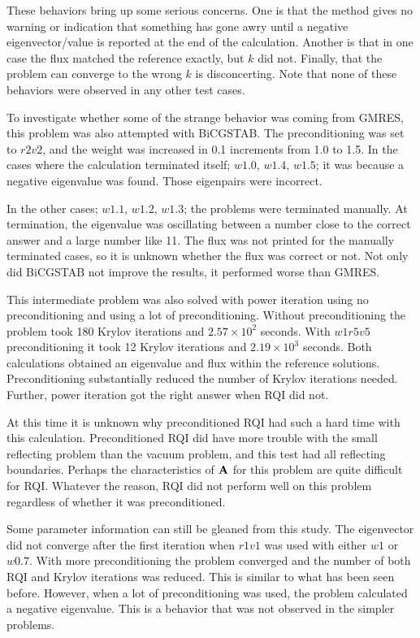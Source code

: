 These behaviors bring up some serious concerns. One is that the method gives no warning or indication that something has gone awry until a negative eigenvector/value is reported at the end of the calculation. Another is that in one case the flux matched the reference exactly, but $k$ did not. Finally, that the problem can converge to the wrong $k$ is disconcerting. Note that none of these behaviors were observed in any other test cases.  

To investigate whether some of the strange behavior was coming from GMRES, this problem was also attempted with BiCGSTAB. The preconditioning was set to $r2v2$, and the weight was increased in 0.1 increments from 1.0 to 1.5. In the cases where the calculation terminated itself; $w1.0$, $w1.4$, $w1.5$; it was because a negative eigenvalue was found. Those eigenpairs were incorrect. 

In the other cases; $w1.1$, $w1.2$, $w1.3$; the problems were terminated manually. At termination, the eigenvalue was oscillating between a number close to the correct answer and a large number like 11. The flux was not printed for the manually terminated cases, so it is unknown whether the flux was correct or not. Not only did BiCGSTAB not improve the results, it performed worse than GMRES.

This intermediate problem was also solved with power iteration using no preconditioning and using a lot of preconditioning. Without preconditioning the problem took 180 Krylov iterations and $2.57 \times 10^{2}$ seconds. With $w1r5v5$ preconditioning it took 12 Krylov iterations and $2.19 \times 10^{3}$ seconds. Both calculations obtained an eigenvalue and flux within the reference solutions. Preconditioning substantially reduced the number of Krylov iterations needed. Further, power iteration got the right answer when RQI did not. 

At this time it is unknown why preconditioned RQI had such a hard time with this calculation. Preconditioned RQI did have more trouble with the small reflecting problem than the vacuum problem, and this test had all reflecting boundaries. Perhaps the characteristics of $\mathbf{A}$ for this problem are quite difficult for RQI. Whatever the reason, RQI did not perform well on this problem regardless of whether it was preconditioned.  

Some parameter information can still be gleaned from this study. The eigenvector did not converge after the first iteration when $r1v1$ was used with either $w1$ or $w0.7$. With more preconditioning the problem converged and the number of both RQI and Krylov iterations was reduced. This is similar to what has been seen before. However, when a lot of preconditioning was used, the problem calculated a negative eigenvalue. This is a behavior that was not observed in the simpler problems. 

